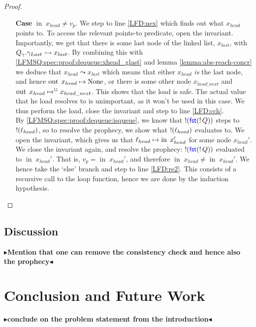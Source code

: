 \documentclass[a4paper, 11pt]{report}
\newcommand{\nIn}[1]{\operatorname{in} \; #1}
\newcommand{\nOut}[1]{\operatorname{out} \; #1}
\newcommand{\Qg}{Q_\gname}
\newcommand{\reach}[2]{#1 \leadsto #2}
\newcommand{\ap}[2]{#1 \rightarrowtail #2}
\newcommand{\todo}[1]{{\color[rgb]{.5,0,0}\textbf{$\blacktriangleright$#1$\blacktriangleleft$}}}
\begin{document}
\begin{proof}
\begin{itemize}
    \item[\textbf{Case}] $\nIn{x_{head}} \neq v_p$.
    We step to line \ref{LFD:nex} which finds out what $x_{head}$ points to. To access the relevant points-to predicate, open the invariant. Importantly, we get that there is some last node of the linked list, $x_{last}$, with $\ap{\Qg.\gname_{Last}}{x_{last}}$. By combining this with \ref{LFMSQ:spec:proof:dequeue:xhead_glast} and lemma \ref{lemma:abs-reach-concr} we deduce that $\reach{x_{head}}{x_{last}}$ which means that either $x_{head}$ \textit{is} the last node, and hence $\nOut{x_{head}} \mapsto \None$, or there is some other node $x_{head\_next}$ and $\nOut{x_{head}} \mapsto^{\persistently} x_{head\_next}$. This shows that the load is safe. The actual value that he load resolves to is unimportant, as it won't be used in this case. We thus perform the load, close the invariant and step to line \ref{LFD:cch}.\\
    By \ref{LFMSQ:spec:proof:dequeue:isqueue}, we know that $\mathop{!}(\operatorname{\textsf{\color{blue} fst}} (\mathop{!} Q))$ steps to $\mathop{!}(\ell_{head})$, so to resolve the prophecy, we show what $\mathop{!}(\ell_{head})$ evaluates to. We open the invariant, which gives us that $\loc_{head} \mapsto \nIn{x_{head}'}$ for some node $x_{head}'$. We close the invariant again, and resolve the prophecy: $\mathop{!}(\operatorname{\textsf{\color{blue} fst}} (\mathop{!} Q))$ evaluated to $\nIn{x_{head}'}$. That is, $v_p = \nIn{x_{head}'}$, and therefore $\nIn{x_{head}} \neq \nIn{x_{head}'}$. We hence take the `else' branch and step to line \ref{LFD:re2}. This consists of a recursive call to the loop function, hence we are done by the induction hypothesis.
  \end{itemize}
\end{proof}


\section{Discussion}
\label{LFMSQ:section:discussion}

\todo{Mention that one can remove the consistency check and hence also the prophecy}


\chapter{Conclusion and Future Work}
\label{ch:conclusion_fw}

\todo{conclude on the problem statement from the introduction}
\end{document}
